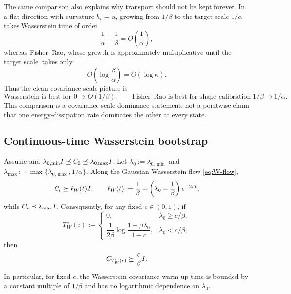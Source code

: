 The same comparison also explains why transport should not be kept forever. In a flat direction
with curvature $h_i=\alpha$, growing from $1/\beta$ to the target scale $1/\alpha$ takes
Wasserstein time of order
\[
    \frac1\alpha-\frac1\beta=O\!\left(\frac1\alpha\right),
\]
whereas Fisher--Rao, whose growth is approximately multiplicative until the target scale, takes
only
\[
    O\!\left(\log\frac\beta\alpha\right)=O(\log\kappa).
\]
Thus the clean covariance-scale picture is
\[
    \boxed{
    \text{Wasserstein is best for }0\to O(1/\beta),
    \qquad
    \text{Fisher--Rao is best for shape calibration }1/\beta\to1/\alpha.
    }
\]
This comparison is a covariance-scale dominance statement, not a pointwise claim that one
energy-dissipation rate dominates the other at every state.

\subsection{Continuous-time Wasserstein bootstrap}

\begin{lemma}
\label{lem:W-cov-bootstrap}
Assume  and
$\lambda_{0,\min}I\preceq C_0\preceq\lambda_{0,\max}I$. Let
$\lambda_0:=\lambda_{0,\min}$ and
$\lambda_{\max}:=\max\{\lambda_{0,\max},1/\alpha\}$. Along the Gaussian Wasserstein flow
\eqref{eq:W-flow},
\[
    C_t\succeq \ell_W(t)I,
    \qquad
    \ell_W(t):=\frac1\beta+\left(\lambda_0-\frac1\beta\right)e^{-2\beta t},
\]
while $C_t\preceq\lambda_{\max}I$. Consequently, for any fixed $c\in(0,1)$, if
\[
    T_W^{\mathrm c}(c)
    :=
    \begin{cases}
    0,
    & \lambda_0\ge c/\beta,\\[3pt]
    \dfrac1{2\beta}\log\dfrac{1-\beta\lambda_0}{1-c},
    & \lambda_0<c/\beta,
    \end{cases}
\]
then
\[
    C_{T_W^{\mathrm c}(c)}\succeq \frac c\beta I.
\]
In particular, for fixed $c$, the Wasserstein covariance warm-up time is bounded by a constant
multiple of $1/\beta$ and has no logarithmic dependence on $\lambda_0$.
\end{lemma}

